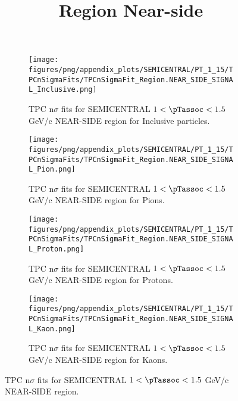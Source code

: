             \begin{figure}[H]
                \title{Region Near-side}
                \begin{subfigure}[b]{0.5\textwidth}
                    \centering
                    \texttt{[image: figures/png/appendix\_plots/SEMICENTRAL/PT\_1\_15/TPCnSigmaFits/TPCnSigmaFit\_Region.NEAR\_SIDE\_SIGNAL\_Inclusive.png]}
                    \caption{TPC n$\sigma$ fits for SEMICENTRAL $1 < \pTassoc < 1.5$ GeV/c NEAR-SIDE region for Inclusive particles.}
                    \label{fig:appendix_SEMICENTRAL_$1 < \pTassoc < 1.5$ GeV/c_NEAR_SIDE_SIGNAL_Inclusive}
                \end{subfigure}
                \begin{subfigure}[b]{0.5\textwidth}
                    \centering
                    \texttt{[image: figures/png/appendix\_plots/SEMICENTRAL/PT\_1\_15/TPCnSigmaFits/TPCnSigmaFit\_Region.NEAR\_SIDE\_SIGNAL\_Pion.png]}
                    \caption{TPC n$\sigma$ fits for SEMICENTRAL $1 < \pTassoc < 1.5$ GeV/c NEAR-SIDE region for Pions.}
                    \label{fig:appendix_SEMICENTRAL_$1 < \pTassoc < 1.5$ GeV/c_NEAR_SIDE_SIGNAL_Pion}
                \end{subfigure}
                \begin{subfigure}[b]{0.5\textwidth}
                    \centering
                    \texttt{[image: figures/png/appendix\_plots/SEMICENTRAL/PT\_1\_15/TPCnSigmaFits/TPCnSigmaFit\_Region.NEAR\_SIDE\_SIGNAL\_Proton.png]}
                    \caption{TPC n$\sigma$ fits for SEMICENTRAL $1 < \pTassoc < 1.5$ GeV/c NEAR-SIDE region for Protons.}
                    \label{fig:appendix_SEMICENTRAL_$1 < \pTassoc < 1.5$ GeV/c_NEAR_SIDE_SIGNAL_Proton}
                \end{subfigure}
                \begin{subfigure}[b]{0.5\textwidth}
                    \centering
                    \texttt{[image: figures/png/appendix\_plots/SEMICENTRAL/PT\_1\_15/TPCnSigmaFits/TPCnSigmaFit\_Region.NEAR\_SIDE\_SIGNAL\_Kaon.png]}
                    \caption{TPC n$\sigma$ fits for SEMICENTRAL $1 < \pTassoc < 1.5$ GeV/c NEAR-SIDE region for Kaons.}
                    \label{fig:appendix_SEMICENTRAL_$1 < \pTassoc < 1.5$ GeV/c_NEAR_SIDE_SIGNAL_Kaon}
                \end{subfigure}
                \caption{TPC n$\sigma$ fits for SEMICENTRAL $1 < \pTassoc < 1.5$ GeV/c NEAR-SIDE region.}
                \label{fig:appendix_SEMICENTRAL_$1 < \pTassoc < 1.5$ GeV/c_NEAR_SIDE_SIGNAL}
            \end{figure}
